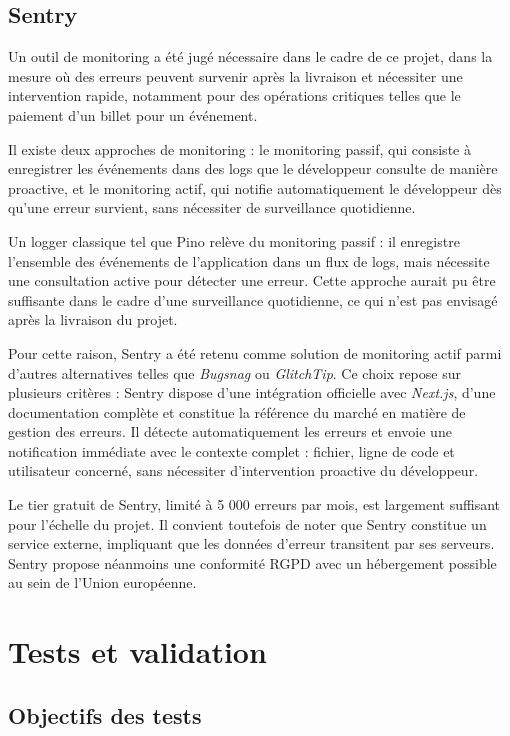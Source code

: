 \documentclass{article}
\begin{document}
\subsection{Sentry}

Un outil de monitoring a été jugé nécessaire dans le cadre 
de ce projet, dans la mesure où des erreurs peuvent survenir 
après la livraison et nécessiter une intervention rapide, 
notamment pour des opérations critiques telles que le paiement 
d'un billet pour un événement.

Il existe deux approches de monitoring : le monitoring passif, 
qui consiste à enregistrer les événements dans des logs que le 
développeur consulte de manière proactive, et le monitoring 
actif, qui notifie automatiquement le développeur dès qu'une 
erreur survient, sans nécessiter de surveillance quotidienne.

Un logger classique tel que Pino relève du monitoring passif : 
il enregistre l'ensemble des événements de l'application dans 
un flux de logs, mais nécessite une consultation active pour 
détecter une erreur. Cette approche aurait pu être suffisante 
dans le cadre d'une surveillance quotidienne, ce qui n'est pas 
envisagé après la livraison du projet.

Pour cette raison, Sentry\cite{sentry} a été retenu comme solution de 
monitoring actif parmi d'autres alternatives telles que 
\textit{Bugsnag} ou \textit{GlitchTip}. Ce choix repose 
sur plusieurs critères : Sentry dispose d'une intégration 
officielle avec \textit{Next.js}, d'une documentation 
complète et constitue la référence du marché en matière 
de gestion des erreurs. Il détecte automatiquement les 
erreurs et envoie une notification immédiate avec le 
contexte complet : fichier, ligne de code et utilisateur 
concerné, sans nécessiter d'intervention proactive 
du développeur.

Le tier gratuit de Sentry, limité à 5 000 erreurs par mois, 
est largement suffisant pour l'échelle du projet. Il convient 
toutefois de noter que Sentry constitue un service externe, 
impliquant que les données d'erreur transitent par ses serveurs. 
Sentry propose néanmoins une conformité RGPD avec un hébergement 
possible au sein de l'Union européenne.

\section{Tests et validation}

\subsection{Objectifs des tests}
\end{document}
